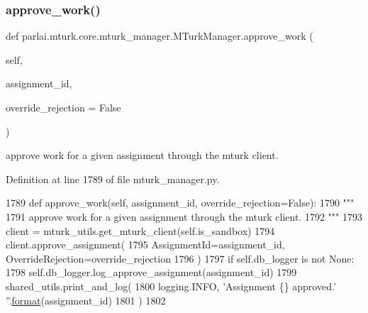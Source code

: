 \subsubsection{\texorpdfstring{approve\+\_\+work()}{approve\_work()}}
{\footnotesize\ttfamily def parlai.\+mturk.\+core.\+mturk\+\_\+manager.\+M\+Turk\+Manager.\+approve\+\_\+work (\begin{DoxyParamCaption}\item[{}]{self,  }\item[{}]{assignment\+\_\+id,  }\item[{}]{override\+\_\+rejection = {\ttfamily False} }\end{DoxyParamCaption})}

\begin{DoxyVerb}approve work for a given assignment through the mturk client.
\end{DoxyVerb}
 

Definition at line 1789 of file mturk\+\_\+manager.\+py.


\begin{DoxyCode}
1789     \textcolor{keyword}{def }approve\_work(self, assignment\_id, override\_rejection=False):
1790         \textcolor{stringliteral}{"""}
1791 \textcolor{stringliteral}{        approve work for a given assignment through the mturk client.}
1792 \textcolor{stringliteral}{        """}
1793         client = mturk\_utils.get\_mturk\_client(self.is\_sandbox)
1794         client.approve\_assignment(
1795             AssignmentId=assignment\_id, OverrideRejection=override\_rejection
1796         )
1797         \textcolor{keywordflow}{if} self.db\_logger \textcolor{keywordflow}{is} \textcolor{keywordflow}{not} \textcolor{keywordtype}{None}:
1798             self.db\_logger.log\_approve\_assignment(assignment\_id)
1799         shared\_utils.print\_and\_log(
1800             logging.INFO, \textcolor{stringliteral}{'Assignment \{\} approved.'} \textcolor{stringliteral}{''}.\hyperlink{namespaceparlai_1_1chat__service_1_1services_1_1messenger_1_1shared__utils_a32e2e2022b824fbaf80c747160b52a76}{format}(assignment\_id)
1801         )
1802 
\end{DoxyCode}
\mbox{\label{classparlai_1_1mturk_1_1core_1_1mturk__manager_1_1MTurkManager_a10c0ba44b2e46b1644620e2d496458af}} 
